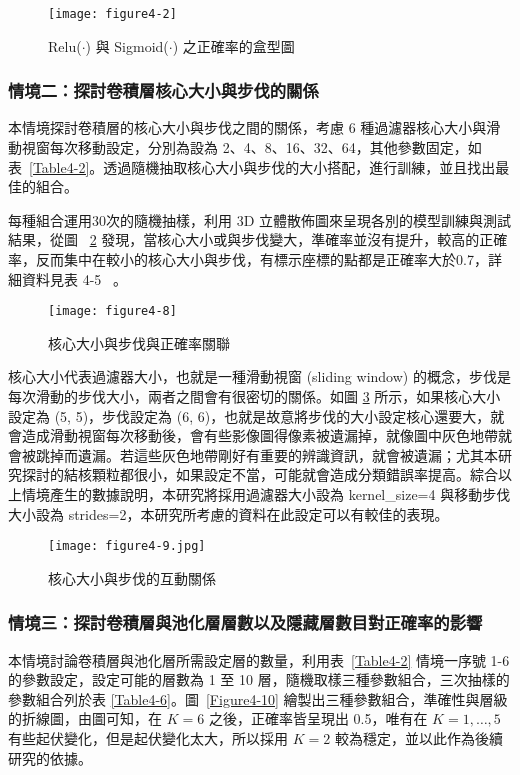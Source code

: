 \documentclass[12pt, a4paper]{article} 				%
\begin{document}
\begin{figure}[!ht]
\begin{center}
\texttt{[image: figure4-2]}
\caption{Relu($\cdot$) 與 Sigmoid($\cdot$) 之正確率的盒型圖}\label{Figure4-2}
\end{center}
\end{figure}

\subsubsection{情境二：探討卷積層核心大小與步伐的關係}
本情境探討卷積層的核心大小與步伐之間的關係，考慮 6 種過濾器核心大小與滑動視窗每次移動設定，分別為設為 2、4、8、16、32、64，其他參數固定，如表~\ref{Table4-2}。透過隨機抽取核心大小與步伐的大小搭配，進行訓練，並且找出最佳的組合。

每種組合運用30次的隨機抽樣，利用 3D 立體散佈圖來呈現各別的模型訓練與測試結果，從圖 ~\ref{Figure4-8} 發現，當核心大小或與步伐變大，準確率並沒有提升，較高的正確率，反而集中在較小的核心大小與步伐，有標示座標的點都是正確率大於0.7，詳細資料見表 4-5~\cite{Chen2018} 。

\begin{figure}[!ht]
\begin{center}
\texttt{[image: figure4-8]}
\caption{核心大小與步伐與正確率關聯}\label{Figure4-8}
\end{center}
\end{figure}

核心大小代表過濾器大小，也就是一種滑動視窗 (sliding window) 的概念，步伐是每次滑動的步伐大小，兩者之間會有很密切的關係。如圖 \ref{Figure4-9} 所示，如果核心大小設定為 (5, 5)，步伐設定為 (6, 6)，也就是故意將步伐的大小設定核心還要大，就會造成滑動視窗每次移動後，會有些影像圖得像素被遺漏掉，就像圖中灰色地帶就會被跳掉而遺漏。若這些灰色地帶剛好有重要的辨識資訊，就會被遺漏；尤其本研究探討的結核顆粒都很小，如果設定不當，可能就會造成分類錯誤率提高。綜合以上情境產生的數據說明，本研究將採用過濾器大小設為 kernel\_size=4 與移動步伐大小設為 strides=2，本研究所考慮的資料在此設定可以有較佳的表現。

\begin{figure}[!ht]
\begin{center}
\texttt{[image: figure4-9.jpg]}
\caption{核心大小與步伐的互動關係}\label{Figure4-9}
\end{center}
\end{figure}
	
\subsubsection{情境三：探討卷積層與池化層層數以及隱藏層數目對正確率的影響}
本情境討論卷積層與池化層所需設定層的數量，利用表~\ref{Table4-2} 情境一序號 1-6 的參數設定，設定可能的層數為 1 至 10 層，隨機取樣三種參數組合，三次抽樣的參數組合列於表 \ref{Table4-6}。圖~\ref{Figure4-10} 繪製出三種參數組合，準確性與層級的折線圖，由圖可知，在 $K=6$ 之後，正確率皆呈現出 0.5，唯有在  $K=1,\ldots, 5$ 有些起伏變化，但是起伏變化太大，所以採用  $K=2$ 較為穩定，並以此作為後續研究的依據。
\end{document}

